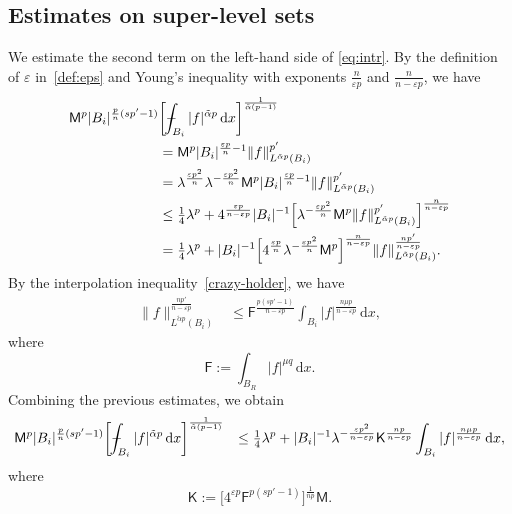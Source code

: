 \documentclass[10pt,letterpaper]{amsart}
\theoremstyle{definition}
\numberwithin{theorem}{section}
\numberwithin{equation}{section}
\newcommand{\1}{\ensuremath{\mathds{1}}}
\newcommand{\dx}{\mathrm{d}x}
\def\Xint#1{\mathchoice
    {\XXint\displaystyle\textstyle{#1}}%
    {\XXint\textstyle\scriptstyle{#1}}%
    {\XXint\scriptstyle\scriptscriptstyle{#1}}%
    {\XXint\scriptscriptstyle\scriptscriptstyle{#1}}%
    \!\int}
\def\XXint#1#2#3{\setbox0=\hbox{$#1{#2#3}{\int}$}
    \vcenter{\hbox{$#2#3$}}\kern-0.5\wd0}
\def\bint{\Xint-}
\renewcommand{\epsilon}{\varepsilon}
\renewcommand{\epsilon}{\varepsilon}
\numberwithin{equation}{section}
\begin{document}
\subsection{Estimates on super-level sets}
We estimate the second term on the left-hand side of \eqref{eq:intr}. By the definition of $\epsilon$ in~\eqref{def:eps} and Young’s inequality with exponents $\frac{n}{\epsilon p}$ and $\frac{n}{n-\epsilon p}$, we have
\begin{align*}
    {\sf M}^p|B_i|^{\frac{p}{n}(sp'- 1)} & \bigg[\bint_{B_i} |f|^{\tilde\alpha p} \,\dx \bigg]^{\frac{1}{\tilde\alpha(p-1)}} \\
    &=
    \mathsf M^p|B_i|^{\frac{\epsilon p}{n}-1} \|f\|^{p'}_{L^{\tilde\alpha p}(B_i)} \\
    &= 
    \lambda^{\frac{\epsilon p^2}{n}} \lambda^{-\frac{\epsilon p^2}{n}}\mathsf M^p|B_i|^{\frac{\epsilon p}{n}-1} \|f\|^{p'}_{L^{\tilde\alpha p}(B_i)} \\
    &\le 
    \tfrac14 \lambda^p +
    4^\frac{\epsilon p}{n-\epsilon p}|B_i|^{-1}
    \Big[\lambda^{-\frac{\epsilon p^2}{n}}\mathsf M^p\|f\|^{p'}_{L^{\tilde\alpha p}(B_i)}\Big]^{\frac{n}{n-\epsilon p}} \\
    &= 
    \tfrac14 \lambda^p +
    |B_i|^{-1}\Big[4^\frac{\epsilon p}{n}
    \lambda^{-\frac{\epsilon p^2}{n}}\mathsf M^p
    \Big]^{\frac{n}{n-\epsilon p}} 
    \|f\|_{L^{\tilde\alpha p}(B_i)}^{\frac{np'}{n-\epsilon p}} .
\end{align*}
By the interpolation inequality~\eqref{crazy-holder}, we have
\begin{align*}
    \|f\|_{L^{\tilde\alpha p}(B_i)}^{\frac{np'}{n-\epsilon p}}
    &\le 
    \mathsf F^{\frac{p(sp'-1)}{n-\epsilon p}}
    \int_{B_i} |f|^{\frac{n\mu p}{n-\epsilon p}} \,\dx,
\end{align*}
where 
\begin{equation*}
    \mathsf F
    :=
    \int_{B_R} |f|^{\mu q} \,\dx .
\end{equation*}
Combining the previous estimates, we obtain 
\begin{align*}
    {\sf M}^p|B_i|^{\frac{p}{n}(sp'- 1)} & \bigg[\bint_{B_i} |f|^{\tilde\alpha p} \,\dx \bigg]^{\frac{1}{\tilde\alpha(p-1)}} 
    &\le 
    \tfrac14 \lambda^p +
    |B_i|^{-1}\mathsf 
    \lambda^{-\frac{\epsilon p^2}{n-\epsilon p}}
    \mathsf K^{\frac{n p}{n-\epsilon p}}
    \int_{B_i} |f|^{\frac{n\mu p}{n-\epsilon p}} \,\dx ,
\end{align*}
where
\begin{equation*}
    \mathsf K
    :=
    \big[4^{\epsilon p}
    \mathsf F^{p(sp'-1)} \big]^{\frac{1}{n p}}\mathsf M .
\end{equation*}
\end{document}
